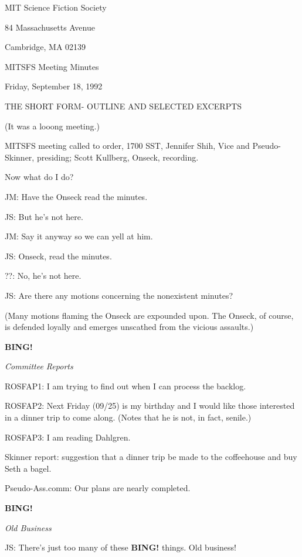 \documentclass[12pt]{article}
\newcommand{\bing}{{\bf BING!} }
\newcommand{\goto}[1]{\bing \vskip 12pt \centerline{{\em{#1}}}}
\begin{document}
\begin{center}

MIT Science Fiction Society 

84 Massachusetts Avenue

Cambridge, MA 02139

\vspace{12pt}

MITSFS Meeting Minutes 

Friday, September 18, 1992

THE SHORT FORM- OUTLINE AND SELECTED EXCERPTS

(It was a looong meeting.)

\end{center}
 
\vspace{18pt}

\setlength{\parskip}{6pt}

\noindent
MITSFS meeting called to order, 1700 SST,
Jennifer Shih, Vice and Pseudo-Skinner, presiding; Scott Kullberg, Onseck, recording.

Now what do I do?

JM: Have the Onseck read the minutes.

JS: But he's not here.

JM: Say it anyway so we can yell at him.

JS: Onseck, read the minutes.

??: No, he's not here.

JS: Are there any motions concerning the nonexistent minutes?

(Many motions flaming the Onseck are expounded upon. The Onseck, of course, is defended loyally and emerges unscathed from the vicious assaults.)

\goto{Committee Reports}

ROSFAP1: I am trying to find out when I can process the backlog.

ROSFAP2: Next Friday (09/25) is my birthday and I would like those interested in a dinner trip to come along. (Notes that he is not, in fact, senile.)

ROSFAP3: I am reading Dahlgren.

Skinner report: suggestion that a dinner trip be made to the coffeehouse and buy Seth a bagel.

Pseudo-Ass.comm: Our plans are nearly completed.

\goto{Old Business}

JS: There's just too many of these \bing things. Old business!
\end{document}
